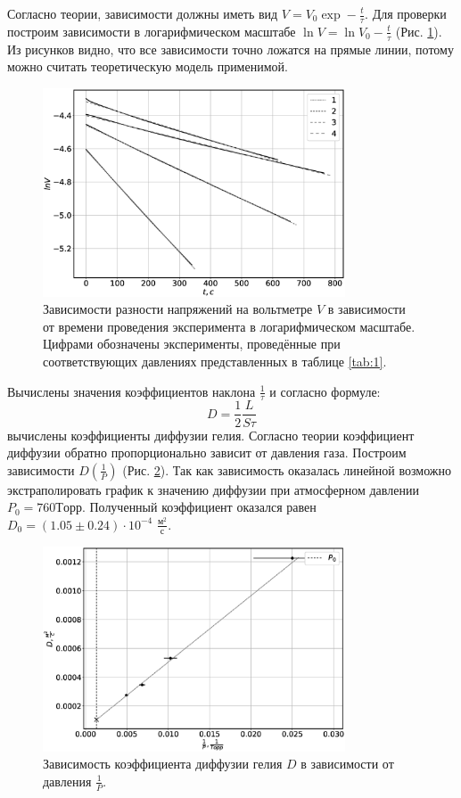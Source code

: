 \documentclass[12pt]{article}
\begin{document}
Согласно теории, зависимости должны иметь вид $V = V_0 \exp -\frac{t}{\tau}$. Для 
проверки построим зависимости в логарифмическом масштабе $\ln V = \ln V_0 - \frac{t}{\tau}$ (Рис. \ref{fig:lnVt}).
Из рисунков видно, что все зависимости точно ложатся на прямые линии, потому можно считать теоретическую модель 
применимой. 

\begin{figure}[H]
    \centering
    \includegraphics[width=0.8\textwidth]{lnVt.eps}
    \caption{Зависимости разности напряжений на вольтметре $V$ в зависимости от времени проведения
        эксперимента в логарифмическом масштабе. Цифрами обозначены эксперименты, проведённые при соответствующих давлениях представленных 
        в таблице \ref{tab:1}.}
    \label{fig:lnVt}
\end{figure}

Вычислены значения коэффициентов наклона $\frac{1}{\tau}$ и согласно формуле:
\[
    D = \frac{1}{2} \frac{L}{S \tau}
\]
вычислены коэффициенты диффузии гелия. Согласно теории коэффициент диффузии обратно пропорционально зависит от давления 
газа. Построим зависимости $D(\frac{1}{P})$ (Рис. \ref{fig:D2P}). Так как зависимость оказалась линейной 
возможно экстраполировать график к значению диффузии при атмосферном давлении $P_0 = 760 Торр$. Полученный 
коэффициент оказался равен $D_0 = (1.05 \pm 0.24) \cdot 10 ^ {-4}$ $\frac{\text{м}^2}{\text{с}}$.    

\begin{figure}[H]
    \centering
    \includegraphics[width=0.8\textwidth]{D2P.eps}
    \caption{Зависимость коэффициента диффузии гелия $D$ в зависимости от давления $\frac{1}{P}$.}
    \label{fig:D2P}
\end{figure}
\end{document}
